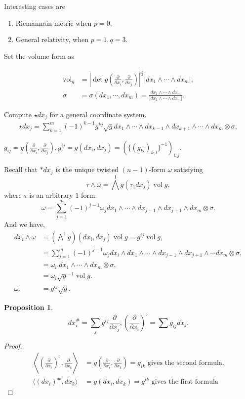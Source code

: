 \documentclass[10pt]{article}
\newtheorem{proposition}{Proposition}[section]
\DeclareMathOperator{\vol}{vol}
\newcommand{\pd}[2]{{\frac {\partial #1} {\partial #2}}}
\begin{document}
Interesting cases are 
\begin{enumerate}
  \item Riemannain metric when $p=0$,
  \item General relativity, when $p=1,q=3$. 
\end{enumerate}

Set the volume form as 

\begin{align*}
  \vol_g & = \left\vert \det g\left(\pd{}{x_i},\pd{}{x_j}\right)\right\vert^{{\frac 1 2}}\vert dx_1\wedge\cdots\wedge dx_m\vert,\\
  \sigma & = \sigma(dx_1,\cdots,dx_m) = {\frac {dx_1\wedge\cdots\wedge dx_m} {\vert dx_1\wedge\cdots\wedge dx_m\vert}}.
\end{align*}

Compute $\star dx_j$ for a general coordinate system.
\begin{align*}
  \star dx_j = \sum_{k=1}^m (-1)^{k-1}g^{kj}\sqrt{g}dx_1\wedge\cdots\wedge dx_{k-1}\wedge dx_{k+1}\wedge\cdots\wedge dx_m\otimes \sigma,
\end{align*}

$g_{ij} = g\left(\pd{}{x_i},\pd{}{x_j}\right),g^{ij} = g(dx_i,dx_j) = (\{(g_{kl})_{k,l}\}^{-1})_{i,j}$.
\par Recall that $\ast dx_j$ is the unique twisted $(n-1)$-form $\omega$ satisfying 
\begin{equation*}
  \tau\wedge \omega = \bigwedge^1 g(\tau_1dx_j)\vol g,
\end{equation*}
where $\tau$ is an arbitrary $1$-form. 
\begin{equation*}
  \omega = \sum_{j=1}^m(-1)^{j-1}\omega_j dx_1\wedge\cdots\wedge dx_{j-1}\wedge dx_{j+1}\wedge dx_m\otimes\sigma.
\end{equation*}
And we have,
\begin{align*}
  dx_i\wedge\omega & = \left(\bigwedge^1 g\right)(dx_i,dx_j)\vol g = g^{ij}\vol g,\\
  & = \sum_{j=1}^m(-1)^{j-1}\omega_jdx_i\wedge dx_1\wedge\cdots\wedge dx_{j-1}\wedge dx_{j+1}\wedge\cdots dx_m\otimes\sigma,\\
  & = \omega_i. dx_1\wedge\cdots\wedge dx_m\otimes\sigma,\\
  & = \omega_i\sqrt{g}^{-1}\vol g.\\
  \omega_i &= g^{ij}\sqrt{g}.
\end{align*}
\begin{proposition}
  \begin{equation*}
    dx_i^\#=\sum_{j}g^{ij}\pd{}{x_j},\left(\pd{}{x_i}\right)^\flat = \sum g_{ij}dx_j.
  \end{equation*}
\end{proposition}
\begin{proof}
  \begin{align*}
    \left\langle\left(\pd{}{x_i}\right)^\flat,\pd{}{x_k}\right\rangle & = g\left(\pd{}{x_i},\pd{}{x_k}\right) = g_{ik}\text{ gives the second formula}.\\
    \langle (dx_i)^\#,dx_k\rangle &= g(dx_i,dx_k) = g^{ik}\text{ gives the first formula}
  \end{align*}
\end{proof}
\end{document}
